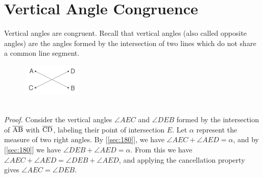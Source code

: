\documentclass{report}
\begin{document}
\section{Vertical Angle Congruence}
\label{sec:vertAngles}
Vertical angles are congruent. Recall that vertical angles (also called opposite angles) are the angles formed by the intersection of two lines which do not share a common line segment.
\\
\begin{figure} %
    \centering
    \includegraphics[width=0.25\textwidth]{vert}
\end{figure}
\\[\baselineskip]
\textit{Proof.} Consider the vertical angles $\angle AEC$ and $\angle DEB$ formed by the intersection of $\overline{\rm AB}$ with $\overline{\rm CD}$, labeling their point of intersection $E$. Let $\alpha$ represent the measure of two right angles. By [\ref{sec:180}], we have $\angle AEC + \angle AED = \alpha$, and by [\ref{sec:180}] we have $\angle DEB + \angle AED = \alpha$. From this we have $\angle AEC + \angle AED = \angle DEB + \angle AED$, and applying the cancellation property gives $\angle AEC = \angle DEB$.
\end{document}
